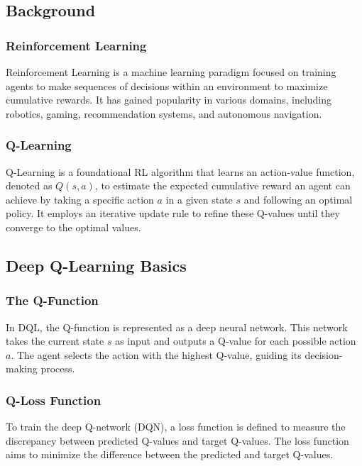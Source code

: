 \documentclass{scrartcl}
\begin{document}
\subsection{Background}

\subsubsection{Reinforcement Learning}

Reinforcement Learning is a machine learning paradigm focused on training agents to make sequences of decisions within an environment to maximize cumulative rewards. It has gained popularity in various domains, including robotics, gaming, recommendation systems, and autonomous navigation.

\subsubsection{Q-Learning}

Q-Learning is a foundational RL algorithm that learns an action-value function, denoted as $Q(s, a)$, to estimate the expected cumulative reward an agent can achieve by taking a specific action $a$ in a given state $s$ and following an optimal policy. It employs an iterative update rule to refine these Q-values until they converge to the optimal values.

\subsection{Deep Q-Learning Basics}

\subsubsection{The Q-Function}

In DQL, the Q-function is represented as a deep neural network. This network takes the current state $s$ as input and outputs a Q-value for each possible action $a$. The agent selects the action with the highest Q-value, guiding its decision-making process.

\subsubsection{Q-Loss Function}

To train the deep Q-network (DQN), a loss function is defined to measure the discrepancy between predicted Q-values and target Q-values. The loss function aims to minimize the difference between the predicted and target Q-values.
\end{document}
